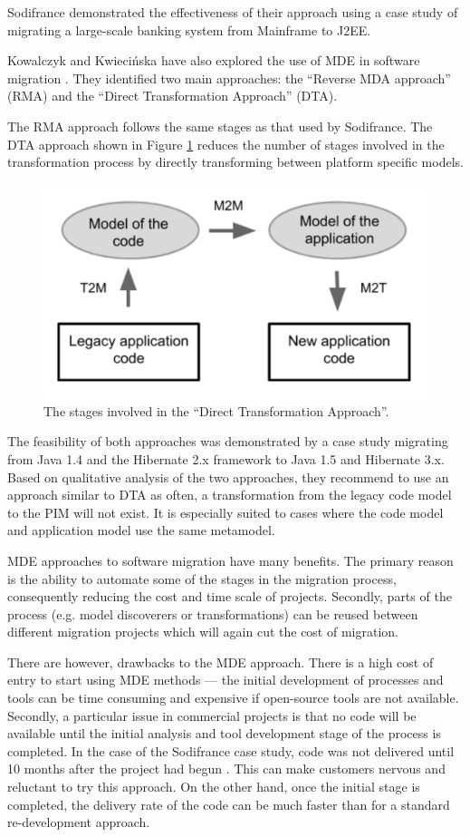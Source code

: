 \documentclass{UoYCSproject}
\begin{document}
Sodifrance demonstrated the effectiveness of their approach using a case study of migrating a large-scale banking system from Mainframe to J2EE.

Kowalczyk and Kwieci\'nska have also explored the use of MDE in software migration \parencite{kowalczyk2009model}. They identified two main approaches: the ``Reverse MDA approach'' (RMA) and the ``Direct Transformation Approach'' (DTA).

The RMA approach follows the same stages as that used by Sodifrance. The DTA approach shown in Figure \ref{fig:dta} reduces the number of stages involved in the transformation process by directly transforming between platform specific models. 

\begin{figure}[h!]
  \centering
  \includegraphics[width=0.6\linewidth]{graphics/dta.png}
  \caption{The stages involved in the ``Direct Transformation Approach''.}
  \label{fig:dta}
\end{figure}

The feasibility of both approaches was demonstrated by a case study migrating from Java 1.4 and the Hibernate 2.x framework to Java 1.5 and Hibernate 3.x. Based on qualitative analysis of the two approaches, they recommend to use an approach similar to DTA as often, a transformation from the legacy code model to the PIM will not exist. It is especially suited to cases where the code model and application model use the same metamodel. 

MDE approaches to software migration have many benefits. The primary reason is the ability to automate some of the stages in the migration process, consequently reducing the cost and time scale of projects. Secondly, parts of the process (e.g. model discoverers or transformations) can be reused between different migration projects which will again cut the cost of migration.

There are however, drawbacks to the MDE approach. There is a high cost of entry to start using MDE methods --- the initial development of processes and tools can be time consuming and expensive if open-source tools are not available. Secondly, a particular issue in commercial projects is that no code will be available until the initial analysis and tool development stage of the process is completed. In the case of the Sodifrance case study, code was not delivered until 10 months after the project had begun \parencite{fleurey2007model}. This can make customers nervous and reluctant to try this approach. On the other hand, once the initial stage is completed, the delivery rate of the code can be much faster than for a standard re-development approach.
\end{document}
